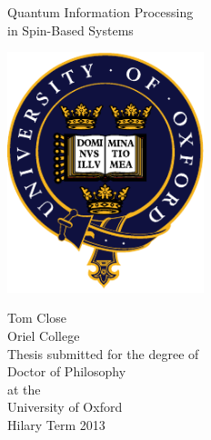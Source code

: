 \pagestyle{empty}
\vspace*{1cm}
\begin{center}
  
  {\Huge Quantum Information Processing}\\[0.5cm] 
  {\Huge in Spin-Based Systems}\\[2cm]

  \centerline{\includegraphics[height=7cm]{Assets/OULogo}}  \vspace{2cm}
  
  {\Large{Tom Close}}\\
  {\Large{Oriel College}}\\[1.5cm]
 
  Thesis submitted for the degree of \\
  Doctor of Philosophy\\
  at the\\
  University of Oxford\\
  Hilary Term 2013

\end{center}
